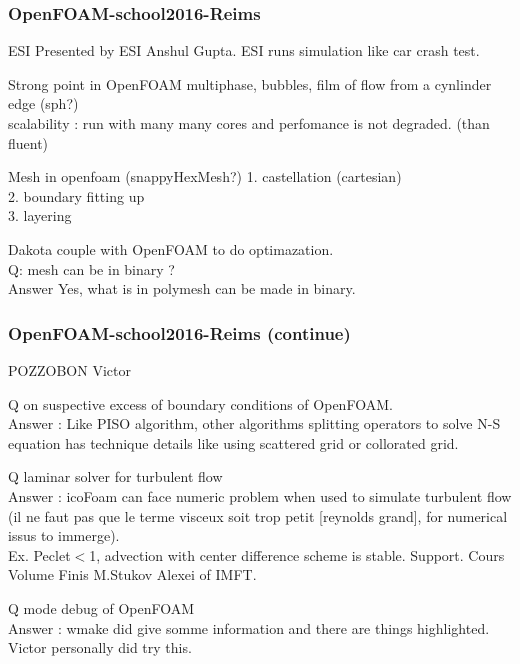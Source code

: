 \documentclass{beamer}
\begin{document}
\begin{frame}
\frametitle{OpenFOAM-school2016-Reims}

\begin{block}{ESI}
Presented by ESI Anshul Gupta. ESI runs simulation like car crash test.
\end{block}

\begin{block}{Strong point in OpenFOAM}
multiphase, bubbles, film of flow from a cynlinder edge (sph?) \\
scalability : run with many many cores and perfomance is not degraded. (than fluent)
\end{block}

\begin{block}{Mesh in openfoam (snappyHexMesh?)} 
1. castellation (cartesian) \\
2. boundary fitting up \\
3. layering
\end{block}

Dakota couple with OpenFOAM to do optimazation.\\

Q: mesh can be in binary ? \\
Answer Yes, what is in polymesh can be made in binary.
\end{frame}

\begin{frame}
\frametitle{OpenFOAM-school2016-Reims (continue)}
POZZOBON Victor

Q on suspective excess of boundary conditions of OpenFOAM. \\
Answer : Like PISO algorithm, other algorithms splitting operators to solve N-S equation has technique details like using scattered grid or collorated grid.

Q laminar solver for turbulent flow \\
Answer : icoFoam can face numeric problem when used to simulate turbulent flow (il ne faut pas que le terme visceux soit trop petit [reynolds grand], for numerical issus to immerge).  \\
	Ex. Peclet$<$1, advection with center difference scheme is stable.
	Support. Cours Volume Finis M.Stukov Alexei of IMFT.

Q mode debug of OpenFOAM \\
Answer : wmake did give somme information and there are things highlighted. Victor personally did try this.

\end{frame}
\end{document}
